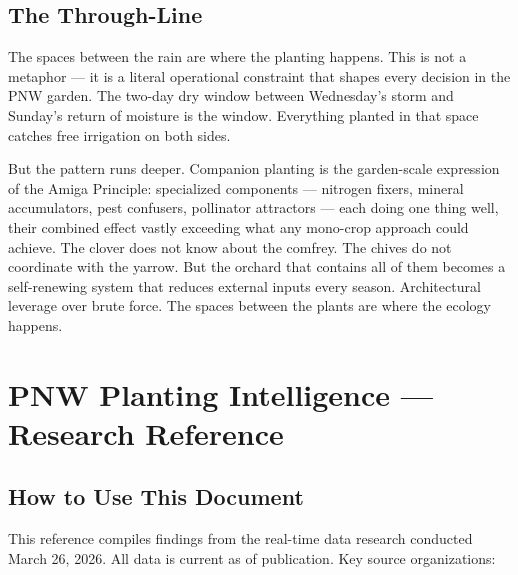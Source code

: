 \documentclass[11pt,letterpaper]{article}
\newcommand{\stageheader}[2]{%
  \noindent\colorbox{#2}{\makebox[\textwidth][l]{%
    \textcolor{white}{\bfseries\sffamily\hspace{6pt}#1\hspace{6pt}}}}%
  \vspace{0.5em}\par%
}
\begin{document}
\subsection{The Through-Line}

The spaces between the rain are where the planting happens. This is not a metaphor --- it is a literal operational constraint that shapes every decision in the PNW garden. The two-day dry window between Wednesday's storm and Sunday's return of moisture is the window. Everything planted in that space catches free irrigation on both sides.

But the pattern runs deeper. Companion planting is the garden-scale expression of the Amiga Principle: specialized components --- nitrogen fixers, mineral accumulators, pest confusers, pollinator attractors --- each doing one thing well, their combined effect vastly exceeding what any mono-crop approach could achieve. The clover does not know about the comfrey. The chives do not coordinate with the yarrow. But the orchard that contains all of them becomes a self-renewing system that reduces external inputs every season. Architectural leverage over brute force. The spaces between the plants are where the ecology happens.

\newpage

\stageheader{STAGE 2 --- RESEARCH REFERENCE}{secondary}

\section{PNW Planting Intelligence --- Research Reference}

\subsection{How to Use This Document}

This reference compiles findings from the real-time data research conducted March 26, 2026. All data is current as of publication. Key source organizations:
\end{document}
